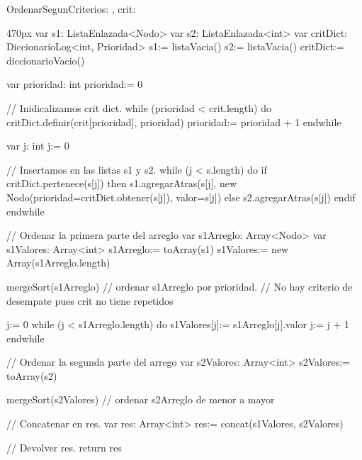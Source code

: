 \documentclass[10pt,a4paper]{article}
\begin{document}
\newpage
{}


\begin{proc}{OrdenarSegunCriterio}{\In s: , \In crit: }{}
  \begin{ImplementationCode}{470px}
      var s1: ListaEnlazada<Nodo>
      var s2: ListaEnlazada<int>
      var critDict: DiccionarioLog<int, Prioridad>
          s1:= listaVacia()
          s2:= listaVacia()
          critDict:= diccionarioVacio()
      
      var prioridad: int
          prioridad:= 0
      
      // Inidicalizamos crit dict.
      while (prioridad < crit.length) do
        critDict.definir(crit[prioridad], prioridad)
        prioridad:= prioridad + 1
      endwhile
    
      var j: int
          j:= 0
      
      // Insertamos en las listas s1 y s2.
      while (j < s.length) do
        if critDict.pertenece(s[j]) then
          s1.agregarAtras(s[j], new Nodo(prioridad=critDict.obtener(s[j]), valor=s[j])
        else
          s2.agregarAtras(s[j])
        endif
      endwhile
    
      // Ordenar la primera parte del arreglo
      var s1Arreglo: Array<Nodo>
      var s1Valores: Array<int>
          s1Arreglo:= toArray(s1)
          s1Valores:= new Array(s1Arreglo.length)
    
      mergeSort(s1Arreglo) // ordenar s1Arreglo por prioridad.
      // No hay criterio de desempate pues crit no tiene repetidos
    
      j:= 0
      while (j < s1Arreglo.length) do
        s1Valores[j]:= s1Arreglo[j].valor
        j:= j + 1
      endwhile 
    
      // Ordenar la segunda parte del arrego
      var s2Valores: Array<int>
          s2Valores:= toArray(s2)
    
      mergeSort(s2Valores) // ordenar s2Arreglo de menor a mayor
    
      // Concatenar en res.
      var res: Array<int>
          res:= concat(s1Valores, s2Valores)
    
      // Devolver res.
      return res
  \end{ImplementationCode}
\end{proc}
\end{document}
